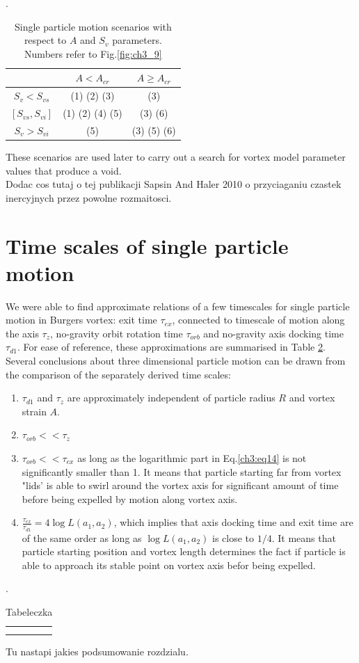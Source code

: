 \documentclass[../main.tex]{subfiles}
\begin{document}
\begin{table}
\small
\tabcolsep=0.2cm
\caption{Single particle motion scenarios with respect to $A$ and $S_v$ parameters. Numbers refer to Fig.\ref{fig:ch3_9}}.
\centering
\begin{tabular}{|c|c|c|}
\hline 
 & $A < A_{cr}$ & $A \geq A_{cr}$\\
\hline
$S_v<S_{v s}$ &(1) (2) (3) & (3)\\
\hline
$[S_{v s},S_{v i}]$ & (1) (2) (4) (5)& (3) (6)\\
\hline
$S_v>S_{v i}$ & (5) & (3) (5) (6)\\
\hline
\end{tabular}
\label{tab:ch3_4}
\end{table}

These scenarios are used later to carry out a search for vortex model parameter values that produce a void. 
\\
Dodac cos tutaj o tej publikacji Sapsin And Haler 2010 o przyciaganiu czastek inercyjnych przez powolne rozmaitosci.

\section{Time scales of single particle motion}
We were able to find approximate relations of a few timescales for single particle motion in Burgers vortex: exit time $\tau_{ex}$, connected to timescale of motion along the axis $\tau_z$, no-gravity orbit rotation time $\tau_{orb}$ and no-gravity axis docking time $\tau_{d1}$. For ease of reference, these approximations are summarised in Table \ref{tab:ch3_5}. Several conclusions about three dimensional particle motion can be drawn from the comparison of the separately derived time scales:
\begin{enumerate}
\item $\tau_{d1}$ and $\tau_z$ are approximately independent of particle radius $R$ and vortex strain $A$.
\item $\tau_{orb}<<\tau_z$
\item $\tau_{orb}<<\tau_{ex}$ as long as the logarithmic part in Eq.\ref{ch3:eq14} is not significantly smaller than 1. It means that particle starting far from vortex "lids' is able to swirl around the vortex axis for significant amount of time before being expelled by motion along vortex axis.
\item $\frac{\tau_{ex}}{\tau_{d1}}=4 \log L(a_1,a_2)$, which implies that axis docking time and exit time are of the same order as long as $\log L(a_1,a_2)$ is close to $1/4$. It means that particle starting position and vortex length determines the fact if particle is able to approach its stable point on vortex axis befor being expelled.
\end{enumerate} 


\begin{table}
\small
\tabcolsep=0.2cm
\caption{Tabeleczka}.
\centering
\begin{tabular}{|c|c|c|}
\hline 
 &  & \\
\\
\hline
\end{tabular}
\label{tab:ch3_5}
\end{table}

Tu nastapi jakies podsumowanie rozdzialu.
\end{document}
